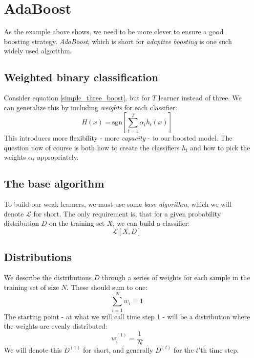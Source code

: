 \documentclass[12pt, a4paper]{article}
\numberwithin{equation}{section}
\begin{document}
\section{AdaBoost}
As the example above shows, we need to be more clever to ensure a good boosting strategy. \textit{AdaBoost}, which is short for \textit{adaptive boosting} is one such widely used algorithm.

\subsection{Weighted binary classification}
Consider equation \ref{simple_three_boost}, but for $T$ learner instead of three. We can generalize this by including \textit{weights} for each classifier:
\begin{equation}
H(x)=\textrm{sgn}\left[\sum_{t=1}^T \alpha_t h_t(x)\right]
\end{equation}
This introduces more flexibility - more \textit{capacity} - to our boosted model. The question now of course is both how to create the classifiers $h_t$ and how to pick the weights $\alpha_t$ appropriately.

\subsection{The base algorithm}
To build our weak learners, we must use some \textit{base algorithm}, which we will denote $\mathcal{L}$ for short. The only requirement is, that for a given probability distribution $D$ on the training set $X$, we can build a classifier:
\begin{equation}
\mathcal{L}[X,D]
\end{equation}

\subsection{Distributions}
We describe the distributions $D$ through a series of weights for each sample in the training set of size $N$. These should sum to one:
\begin{equation}
\sum_{i=1}^N w_i=1
\end{equation}
The starting point - at what we will call time step 1 - will be a distribution where the weights are evenly distributed:
\begin{equation}
w_i^{(1)}=\frac{1}{N}
\label{time_step_1}
\end{equation}
We will denote this $D^{(1)}$ for short, and generally $D^{(t)}$ for the $t$'th time step.
\end{document}
